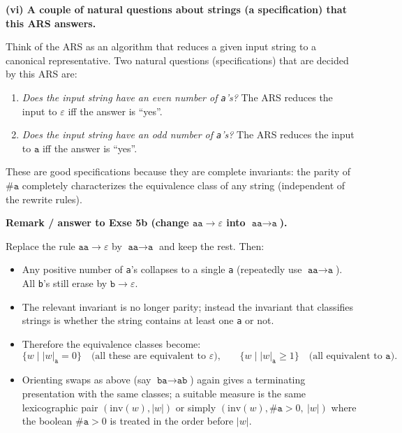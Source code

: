 \documentclass[12pt]{article}
\begin{document}
\bigskip

\textbf{(vi) A couple of natural questions about strings (a specification) that this ARS answers.}

Think of the ARS as an algorithm that reduces a given input string to a canonical representative. Two natural questions (specifications) that are decided by this ARS are:

\begin{enumerate}
  \item \emph{Does the input string have an even number of \texttt{a}'s?}  
  The ARS reduces the input to \(\varepsilon\) iff the answer is “yes”.
  \item \emph{Does the input string have an odd number of \texttt{a}'s?}  
  The ARS reduces the input to \(\texttt{a}\) iff the answer is “yes”.
\end{enumerate}

These are good specifications because they are complete invariants: the parity of \(\#\texttt{a}\) completely characterizes the equivalence class of any string (independent of the rewrite rules).

\bigskip

\textbf{Remark / answer to Exse 5b (change \(\texttt{aa}\to\varepsilon\) into \(\texttt{aa}\to\texttt{a}\)).}

Replace the rule \(\texttt{aa}\to\varepsilon\) by \(\texttt{aa}\to\texttt{a}\) and keep the rest. Then:

\begin{itemize}
  \item Any positive number of \texttt{a}'s collapses to a single \texttt{a} (repeatedly use \(\texttt{aa}\to\texttt{a}\)). All \texttt{b}'s still erase by \(\texttt{b}\to\varepsilon\).
  \item The relevant invariant is no longer parity; instead the invariant that classifies strings is whether the string contains at least one \texttt{a} or not.
  \item Therefore the equivalence classes become:
    \[
      \{w\mid |w|_{\texttt{a}}=0\}\quad\text{(all these are equivalent to }\varepsilon\text{),}
      \qquad
      \{w\mid |w|_{\texttt{a}}\ge 1\}\quad\text{(all equivalent to }\texttt{a}\text{).}
    \]
  \item Orienting swaps as above (say \(\texttt{ba}\to\texttt{ab}\)) again gives a terminating presentation with the same classes; a suitable measure is the same lexicographic pair \((\mathrm{inv}(w),|w|)\) or simply \((\mathrm{inv}(w),\#\texttt{a}>0,\ |w|)\) where the boolean \(\#\texttt{a}>0\) is treated in the order before \(|w|\).
\end{itemize}
\end{document}
